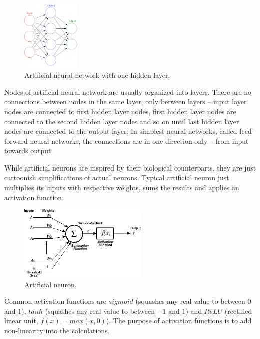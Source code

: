 \documentclass[a4paper,11pt]{article}
\begin{document}
\begin{figure}[h]
	\centering
	\includegraphics[width=0.25\textwidth]{ann.png}
	\caption{Artificial neural network with one hidden layer.}
\end{figure}

Nodes of artificial neural network are usually organized into layers. There are no connections between nodes in the same layer, only between layers -- input layer nodes are connected to first hidden layer nodes, first hidden layer nodes are connected to the second hidden layer nodes and so on until last hidden layer nodes are connected to the output layer. In simplest neural networks, called feed-forward neural networks, the connections are in one direction only -- from input towards output.

While artificial neurons are inspired by their biological counterparts, they are just cartoonish simplifications of actual neurons. Typical artificial neuron just multiplies its inputs with respective weights, sums the results and applies an activation function. 

\begin{figure}[h]
	\centering
	\includegraphics[width=0.55\textwidth]{neuron.png}
	\caption{Artificial neuron.}
\end{figure}

Common activation functions are $sigmoid$ (squashes any real value to between $0$ and $1$), $tanh$ (squashes any real value to between $-1$ and $1$) and $ReLU$ (rectified linear unit, $f(x)=max(x, 0)$). The purpose of activation functions is to add non-linearity into the calculations.
\end{document}
